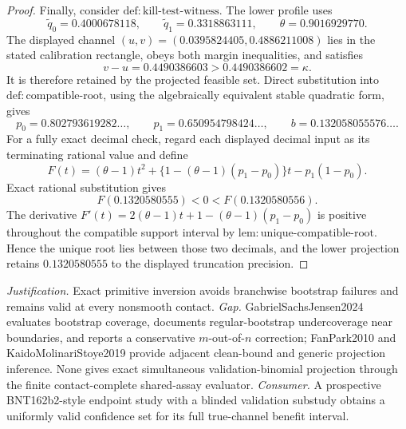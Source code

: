 \documentclass{article}
\begin{document}
\begin{proof}
Finally, consider \(\mathrm{def:kill\text{-}test\text{-}witness}\). The lower profile uses
\[
\widetilde q_0=0.4000678118,
\qquad
\widetilde q_1=0.3318863111,
\qquad
\theta=0.9016929770.
\]
The displayed channel \((u,v)=(0.0395824405,0.4886211008)\) lies in the stated calibration rectangle, obeys both margin inequalities, and satisfies
\[
v-u=0.4490386603>0.4490386602=\kappa.
\]
It is therefore retained by the projected feasible set. Direct substitution into \(\mathrm{def:compatible\text{-}root}\), using the algebraically equivalent stable quadratic form, gives
\[
p_0=0.802793619282\ldots,
\qquad
p_1=0.650954798424\ldots,
\qquad
b=0.132058055576\ldots.
\]
For a fully exact decimal check, regard each displayed decimal input as its terminating rational value and define
\[
F(t)=(\theta-1)t^2+
\{1-(\theta-1)(p_1-p_0)\}t-p_1(1-p_0).
\]
Exact rational substitution gives
\[
F(0.1320580555)<0<F(0.1320580556).
\]
The derivative \(F'(t)=2(\theta-1)t+1-(\theta-1)(p_1-p_0)\) is positive throughout the compatible support interval by \(\mathrm{lem:unique\text{-}compatible\text{-}root}\). Hence the unique root lies between those two decimals, and the lower projection retains \(0.1320580555\) to the displayed truncation precision.
\end{proof}
\par\smallskip\noindent \textit{Justification.} Exact primitive inversion avoids branchwise bootstrap failures and remains valid at every nonsmooth contact. \textit{Gap.} GabrielSachsJensen2024 evaluates bootstrap coverage, documents regular-bootstrap undercoverage near boundaries, and reports a conservative \(m\)-out-of-\(n\) correction; FanPark2010 and KaidoMolinariStoye2019 provide adjacent clean-bound and generic projection inference. None gives exact simultaneous validation-binomial projection through the finite contact-complete shared-assay evaluator. \textit{Consumer.} A prospective BNT162b2-style endpoint study with a blinded validation substudy obtains a uniformly valid confidence set for its full true-channel benefit interval.
\end{document}
